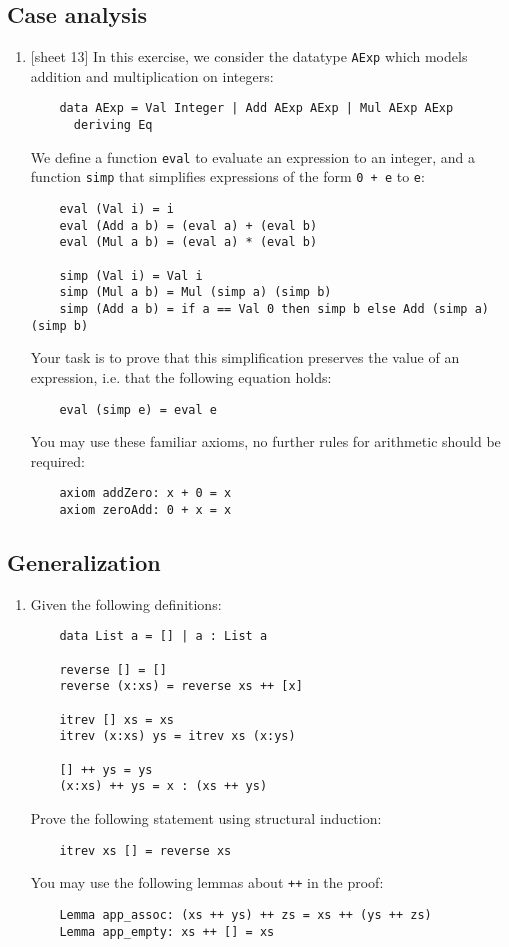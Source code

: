 \documentclass{article}
\def\code#1{\texttt{#1}}
\begin{document}
\subsection{Case analysis}
\begin{enumerate}
    \item {[sheet 13]} In this exercise, we consider the datatype \code{AExp} which models addition and multiplication on integers:
        \begin{verbatim}
    data AExp = Val Integer | Add AExp AExp | Mul AExp AExp
      deriving Eq
        \end{verbatim}
        We define a function \code{eval} to evaluate an expression to an integer, and a function \code{simp} that simplifies expressions of the form \code{0 + e} to \code{e}:
        \begin{verbatim}
    eval (Val i) = i
    eval (Add a b) = (eval a) + (eval b)
    eval (Mul a b) = (eval a) * (eval b)

    simp (Val i) = Val i
    simp (Mul a b) = Mul (simp a) (simp b)
    simp (Add a b) = if a == Val 0 then simp b else Add (simp a) (simp b)
        \end{verbatim}
        Your task is to prove that this simplification preserves the value of an expression, i.e. that the following equation holds:
        \begin{verbatim}
    eval (simp e) = eval e
        \end{verbatim}
        You may use these familiar axioms, no further rules for arithmetic should be required:
        \begin{verbatim}
    axiom addZero: x + 0 = x
    axiom zeroAdd: 0 + x = x
        \end{verbatim}
\end{enumerate}

\subsection{Generalization}
\begin{enumerate}
    \item Given the following definitions:
        \begin{verbatim}
    data List a = [] | a : List a

    reverse [] = []
    reverse (x:xs) = reverse xs ++ [x]

    itrev [] xs = xs
    itrev (x:xs) ys = itrev xs (x:ys)

    [] ++ ys = ys
    (x:xs) ++ ys = x : (xs ++ ys)
        \end{verbatim}
        Prove the following statement using structural induction:
        \begin{verbatim}
    itrev xs [] = reverse xs
        \end{verbatim}
        You may use the following lemmas about \code{++} in the proof:
        \begin{verbatim}
    Lemma app_assoc: (xs ++ ys) ++ zs = xs ++ (ys ++ zs)
    Lemma app_empty: xs ++ [] = xs
        \end{verbatim}
\end{enumerate}
\end{document}
